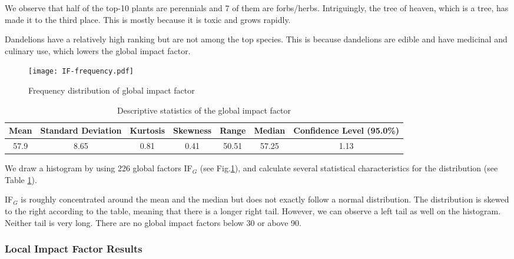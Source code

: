 \documentclass[12pt]{article}
\begin{document}
		We observe that half of the top-10 plants are perennials and 7 of them are forbs/herbs.  Intriguingly, the tree of heaven, which is a tree, has made it to the third place.  This is mostly because it is toxic and grows rapidly. 
		
		Dandelions have a relatively high ranking but are not among the top species.  This is because dandelions are edible and have medicinal and culinary use, which lowers the global impact factor.
	
		\begin{figure}[htbp]
		\centering
		\texttt{[image: IF-frequency.pdf]}
		\caption{Frequency distribution of global impact factor}
		\label{fig:freqIF}
		\end{figure}
	
		{
			\fontsize{10}{14}\selectfont
			{
				\begin{longtable}{ccccccc}
					\caption{Descriptive statistics of the global impact factor}
					\label{tb:IFDistribution}\\
					
					\toprule
					Mean&Standard Deviation&Kurtosis&Skewness&Range&Median&Confidence Level (95.0\%)\\
					\toprule
					57.9&8.65&0.81&0.41&50.51&57.25&1.13\\
					\bottomrule
				\end{longtable}
			}
		}
		
		We draw a histogram by using 226 global factors IF$_G$ (see Fig.\ref{fig:freqIF}), and calculate several statistical characteristics for the distribution (see Table \ref{tb:IFDistribution}).  
		
		IF$_G$ is roughly concentrated around the mean and the median but does not exactly follow a normal distribution.  The distribution is skewed to the right according to the table, meaning that there is a longer right tail.  However, we can observe a left tail as well on the histogram.  Neither tail is very long.  There are no global impact factors below 30 or above 90.
		
	\subsubsection{Local Impact Factor Results}
		
\end{document}
